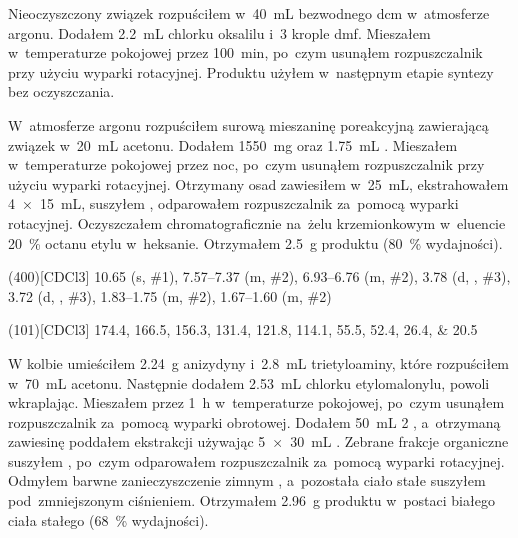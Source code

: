 Nieoczyszczony związek  rozpuściłem w~\SI{40}{\mL}
  bezwodnego \gls{dcm} w~atmosferze argonu. Dodałem \SI{2.2}{\mL} chlorku oksalilu
  i~\num{3} krople \gls{dmf}.
Mieszałem w~temperaturze pokojowej przez \SI{100}{\minute}, po~czym usunąłem rozpuszczalnik
  przy użyciu wyparki rotacyjnej.
Produktu użyłem w~następnym etapie syntezy bez oczyszczania.

W~atmosferze argonu rozpuściłem surową mieszaninę poreakcyjną zawierającą związek
   w~\SI{20}{\mL} acetonu.
Dodałem \SI{1550}{\milli\gram}  oraz \SI{1.75}{\mL} .
Mieszałem w~temperaturze pokojowej przez noc, po~czym usunąłem rozpuszczalnik przy użyciu
  wyparki rotacyjnej.
Otrzymany osad zawiesiłem w~\SI{25}{\mL},
  ekstrahowałem \SI[product-units = single]{4 x 15}{\mL},
  suszyłem , odparowałem rozpuszczalnik za~pomocą wyparki rotacyjnej.
Oczyszczałem chromatograficznie na~żelu krzemionkowym w~eluencie \SI{20}{\percent} octanu
  etylu w~heksanie.
Otrzymałem \SI{2.5}{\gram} produktu (\SI{80}{\percent} wydajności).

\begin{fullexp}
  \NMR(400)[CDCl3] \num{10.65} (s, \#{1}), \numrange{7.57}{7.37} (m, \#{2}), \numrange{6.93}{6.76} (m, \#{2}), \num{3.78} (d, , \#{3}), \num{3.72} (d, , \#{3}), \numrange{1.83}{1.75} (m, \#{2}), \numrange{1.67}{1.60} (m, \#{2})\par\noindent
  (101)[CDCl3] \numlist{174.4; 166.5; 156.3; 131.4; 121.8; 114.1; 55.5; 52.4; 26.4; 20.5}
\end{fullexp}

W kolbie umieściłem \SI{2.24}{\gram} anizydyny i~\SI{2.8}{\mL} trietyloaminy,
  które rozpuściłem w~\SI{70}{\mL} acetonu.
Następnie dodałem \SI{2.53}{\mL} chlorku etylomalonylu, powoli wkraplając.
Mieszałem przez \SI{1}{\hour} w~temperaturze pokojowej, po~czym usunąłem rozpuszczalnik
  za~pomocą wyparki obrotowej.
Dodałem \SI{50}{\mL} \SI{2}{\Molar} , a~otrzymaną zawiesinę poddałem ekstrakcji
  używając \SI[product-units = single]{5 x 30}{\mL} .
Zebrane frakcje organiczne suszyłem , po~czym odparowałem rozpuszczalnik za~pomocą
  wyparki rotacyjnej.
Odmyłem barwne zanieczyszczenie zimnym ,
  a~pozostała ciało stałe suszyłem pod~zmniejszonym ciśnieniem.
Otrzymałem \SI{2.96}{\gram} produktu w~postaci białego ciała stałego (\SI{68}{\percent} wydajności).

